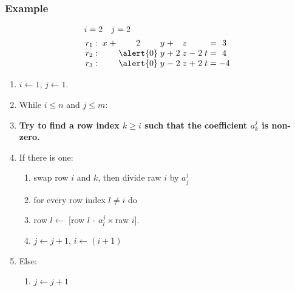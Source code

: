 \documentclass{beamer}
\begin{document}
\begin{frame}
  \frametitle{Example}
  
  \[\arraycolsep=1.4pt
  \begin{aligned}
    &i = 2 \quad j = 2\\
      &
    \begin{array}{lcccccccccccccc}
        r_1  & : &  & x & + & 2 & y & + &  & z &  & & & = & 3\\
        r_2 & : &   &   &  &  \alert{0} & y & + & 2 & z & - & 2 & t  & = & 4\\
        r_3  & : &  &   &  & \alert{0}  & y  & - & 2 & z & + & 2 & t & = & -4\\
    \end{array}
  \end{aligned}
  \]
  
  
  \begin{enumerate}
  \item $i \leftarrow 1$, $j \leftarrow 1$.
  \item While $i \le n$ and $j \le m$:
  \item {\bf Try to find a row index $k \ge i$ such that the coefficient $a^j_k$ is non-zero.}
  \item If there is one:
    \begin{enumerate}
    \item swap row $i$ and $k$, then divide raw $i$ by $a^{j}_j$
    \item for every row index $l \neq i$ do 
    \item row $l \leftarrow$ [row $l$ - $a^j_l\times$raw $i$].
    \item $j \leftarrow j+1$, $i \leftarrow (i+1)$
    \end{enumerate}
  \item Else:
    \begin{enumerate}
    \item $j \leftarrow j+1$
    \end{enumerate}
  \end{enumerate}
  
\end{frame}
\end{document}
